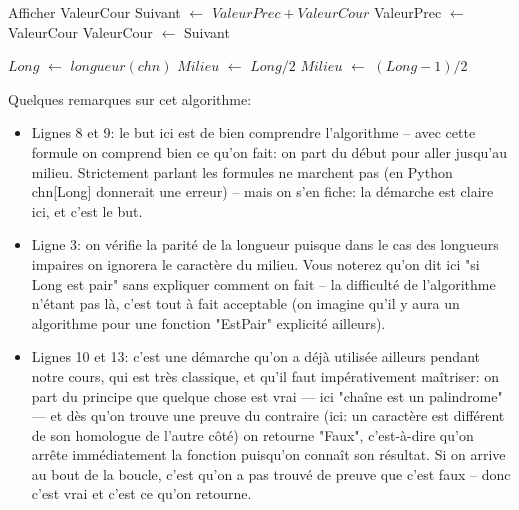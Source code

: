 \documentclass[12pt]{article}
\begin{document}
\begin{MaReponse}
\begin{alphenum}
\begin{algorithmic}[1]
				\State Afficher ValeurCour
				\State Suivant $\leftarrow$ $ValeurPrec + ValeurCour$
				\State ValeurPrec $\leftarrow$ ValeurCour
				\State ValeurCour $\leftarrow$ Suivant
				\EndFor
				\EndFunction
			\end{algorithmic}
			\vspace{\baselineskip}
			\item
			\begin{algorithmic}[1]
				\State $Long$ $\leftarrow$ $longueur(chn)$
				\State $Milieu$ $\leftarrow$ $Long / 2$
				\Else
				\State $Milieu$ $\leftarrow$ $(Long  - 1) / 2$
				\EndIf
				\State{}
				\EndIf
				\EndFor
				\State{}
				\EndFunction
			\end{algorithmic}
			Quelques remarques sur cet algorithme:
			\begin{itemize}
				\item Lignes 8 et 9: le but ici est de bien comprendre l'algorithme -- avec cette formule on comprend bien ce qu'on fait: on part du début pour aller jusqu'au milieu. Strictement parlant les formules ne marchent pas (en Python chn[Long] donnerait une erreur) -- mais on s'en fiche: la démarche est claire ici, et c'est le but.
				\item Ligne 3: on vérifie la parité de la longueur puisque dans le cas des longueurs impaires on ignorera le caractère du milieu. Vous noterez qu'on dit ici "si Long est pair" sans expliquer comment on fait -- la difficulté de l'algorithme n'étant pas là, c'est tout à fait acceptable (on imagine qu'il y aura un algorithme pour une fonction "EstPair" explicité ailleurs).
				\item Lignes 10 et 13: c'est une démarche qu'on a déjà utilisée ailleurs pendant notre cours, qui est très classique, et qu'il faut impérativement maîtriser: on part du principe que quelque chose est vrai --- ici "chaîne est un palindrome" --- et dès qu'on trouve une preuve du contraire (ici: un caractère est différent de son homologue de l'autre côté) on retourne "Faux", c'est-à-dire qu'on arrête immédiatement la fonction puisqu'on connaît son résultat. Si on arrive au bout de la boucle, c'est qu'on a pas trouvé de preuve que c'est faux -- donc c'est vrai et c'est ce qu'on retourne.
			\end{itemize}
		\end{alphenum}
	\end{MaReponse}
	
\end{document}
